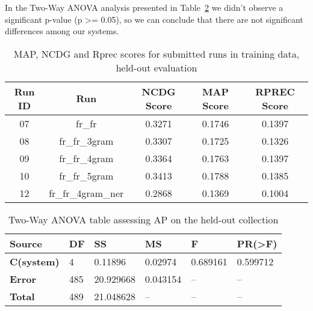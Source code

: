 In the Two-Way ANOVA analysis presented in Table~\ref{tab:ho_anova} we didn't observe a significant p-value (p >= 0.05),
so we can conclude that there are not significant differences among our systems.

\begin{table}[h!]
    \begin{center}
        \caption{MAP, NCDG and Rprec scores for submitted runs in training data, held-out evaluation}
        \label{tab:ho_scores}
        \begin{tabular}{|c|c||c|c|c|}
            \hline
            \textbf{Run ID} & \textbf{Run} & \textbf{NCDG Score} & \textbf{MAP Score} & \textbf{RPREC Score}\\
            \hline\hline
            07 & fr\_fr & 0.3271 & 0.1746 & 0.1397 \\
            \hline
            08 & fr\_fr\_3gram & 0.3307 & 0.1725 & 0.1326 \\
            \hline
            09 & fr\_fr\_4gram & 0.3364 & 0.1763 & 0.1397 \\
            \hline
            10 & fr\_fr\_5gram & 0.3413 & 0.1788 & 0.1385 \\
            \hline
            12 & fr\_fr\_4gram\_ner & 0.2868 & 0.1369 & 0.1004 \\
            \hline
        \end{tabular}
    \end{center}
\end{table}

\begin{table}[h!]
    \centering
    \caption{Two-Way ANOVA table assessing AP on the held-out collection}
    \label{tab:ho_anova}
    \begin{tabular}{|l|l|l|l|l|l|}
    \hline
        \textbf{Source} & \textbf{DF} & \textbf{SS} & \textbf{MS} & \textbf{F} & \textbf{PR(>F)} \\ \hline\hline
        \textbf{C(system)} & 4 & 0.11896 & 0.02974 & 0.689161 & 0.599712 \\ \hline
        \textbf{Error} & 485 & 20.929668 & 0.043154 & -- & -- \\ \hline
        \textbf{Total} & 489 & 21.048628 & -- & -- & -- \\ \hline
    \end{tabular}
\end{table}

